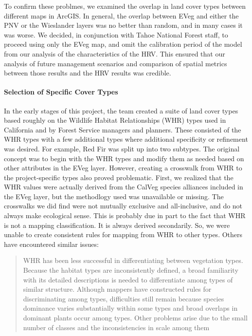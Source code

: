 To confirm these problmes, we examined the overlap in land cover types between different maps in ArcGIS. In general, the overlap between EVeg and either the PNV or the Wieslander layers was no better than random, and in many cases it was worse. We decided, in conjunction with Tahoe National Forest staff, to proceed using only the EVeg map, and omit the calibration period of the model from our analysis of the characteristics of the HRV. This ensured that our analysis of future management scenarios and comparison of spatial metrics between those results and the HRV results was credible.

\paragraph{Selection of Specific Cover Types}
In the early stages of this project, the team created a suite of land cover types based roughly on the Wildlife Habitat Relationships (WHR) types used in California and by Forest Service managers and planners. These consisted of the WHR types with a few additional types where additional specificity or refinement was desired. For example, Red Fir was split up into two subtypes. The original concept was to begin with the WHR types and modify them as needed based on other attributes in the EVeg layer. However, creating a crosswalk from WHR to the project-specific types also proved problematic. First, we realized that the WHR values were actually derived from the CalVeg species alliances included in the EVeg layer, but the methodlogy used was unavailable or missing. The crosswalks we did find were not mutually exclusive and all-inclusive, and do not always make ecological sense. This is probably due in part to the fact that WHR is not a mapping classification. It is always derived secondarily. So, we were unable to create consistent rules for mapping from WHR to other types. Others have encountered similar issues:
%
\begin{quote}
WHR has been less successful in differentiating between vegetation types. Because the habitat types are inconsistently defined, a broad familiarity with its detailed descriptions is needed to differentiate among types of similar structure. Although mappers have constructed rules for discriminating among types, difficulties still remain because species dominance varies substantially within some types and broad overlaps in dominant plants occur among types. Other problems arise due to the small number of classes and the inconsistencies in scale among them 
\end{quote}
